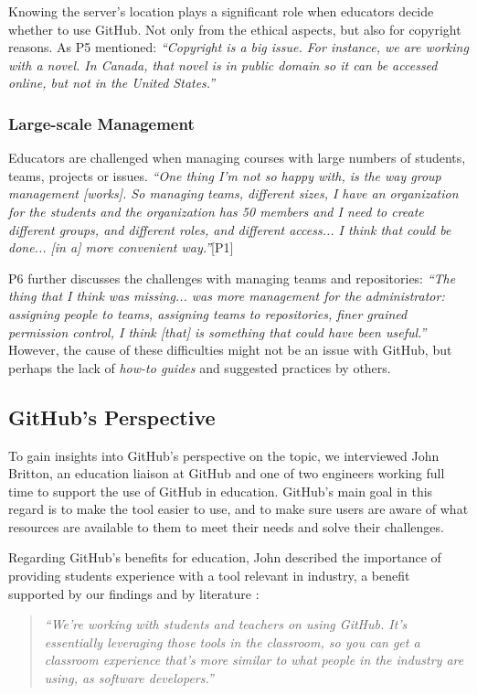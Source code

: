Knowing the server's location plays a significant role when educators decide whether to use GitHub. Not only from the ethical aspects, but also for copyright reasons. As P5 mentioned: \textit{``Copyright is a big issue. For instance, we are working with a novel. In Canada, that novel is in public domain so it can be accessed online, but not in the United States.''}

\subsubsection{Large-scale Management}
Educators are challenged when managing courses with large numbers of students, teams, projects or issues. \textit{``One thing I'm not so happy with, is the way group management [works]. So managing teams, different sizes, I have an organization for the students and the organization has 50 members and I need to create different groups, and different roles, and different access... I think that could be done... [in a] more convenient way.''}[P1]

P6 further discusses the challenges with managing teams and repositories: \textit{``The thing that I think was missing... was more management for the administrator: assigning people to teams, assigning teams to repositories, finer grained permission control, I think [that] is something that could have been useful.''} However, the cause of these difficulties might not be an issue with GitHub, but perhaps the lack of \textit{how-to guides} and suggested practices by others.

\subsection{GitHub's Perspective}
To gain insights into GitHub's perspective on the topic, we interviewed John Britton, an education liaison at GitHub and one of two engineers working full time to support the use of GitHub in education. GitHub's main goal in this regard is to make the tool easier to use, and to make sure users are aware of what resources are available to them to meet their needs and solve their challenges.

Regarding GitHub's benefits for education, John described the importance of providing students experience with a tool relevant in industry, a benefit supported by our findings and by literature \cite{haaranen2015teaching}:
\begin{quote}\textit{``We're working with students and teachers on using GitHub. It's essentially leveraging those tools in the classroom, so you can get a classroom experience that's more similar to what people in the industry are using, as software developers.''}\end{quote}

